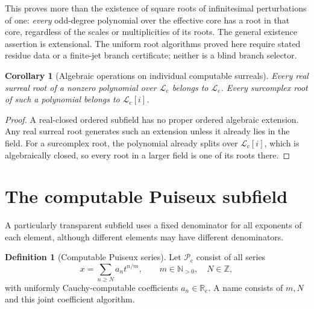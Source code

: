 \documentclass[11pt,letterpaper]{article}
\numberwithin{equation}{section}
\newtheorem{corollary}[theorem]{Corollary}
\theoremstyle{definition}
\newtheorem{definition}[theorem]{Definition}
\theoremstyle{remark}
\newcommand{\Rc}{\mathbb R_{\mathrm c}}
\newcommand{\Lc}{\mathcal L_{\mathrm c}}
\newcommand{\Pc}{\mathcal P_{\mathrm c}}
\newcommand{\N}{\mathbb N}
\newcommand{\Z}{\mathbb Z}
\begin{document}
This proves more than the existence of square roots of infinitesimal
perturbations of one: \emph{every} odd-degree polynomial over the effective
core has a root in that core, regardless of the scales or multiplicities
of its roots. The general existence assertion is extensional. The uniform root algorithms proved here require stated residue data or
a finite-jet branch certificate; neither is a blind branch selector.

\begin{corollary}[Algebraic operations on individual computable surreals]
Every real surreal root of a \emph{nonzero} polynomial over $\Lc$ belongs to $\Lc$.
Every surcomplex root of such a polynomial belongs to $\Lc[i]$.
\end{corollary}
\begin{proof}
A real-closed ordered subfield has no proper ordered algebraic extension.
Any real surreal root generates such an extension unless it already lies
in the field. For a surcomplex root, the polynomial already splits over
$\Lc[i]$, which is algebraically closed, so every root in a larger field
is one of its roots there.
\end{proof}

\section{The computable Puiseux subfield}
\label{sec:puiseux}

A particularly transparent subfield uses a fixed denominator for all
exponents of each element, although different elements may have different
denominators.

\begin{definition}[Computable Puiseux series]
\label{def:puiseux}
Let $\Pc$ consist of all series
\begin{equation}\label{eq:Puiseux}
 x=\sum_{n\ge N}a_nt^{n/m},
 \qquad m\in\N_{>0},\quad N\in\Z,
\end{equation}
with uniformly Cauchy-computable coefficients $a_n\in\Rc$. A name consists
of $m,N$ and this joint coefficient algorithm.
\end{definition}
\end{document}
